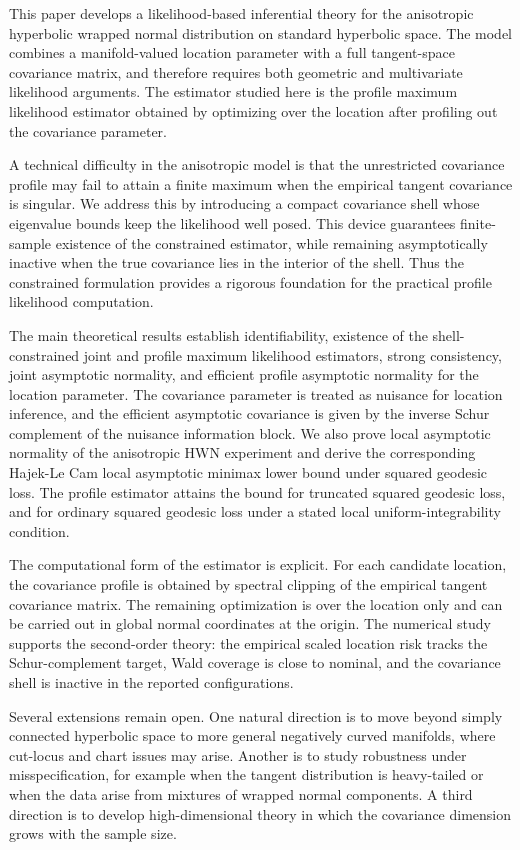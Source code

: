 \documentclass[11pt]{article}
\begin{document}
This paper develops a likelihood-based inferential theory for the anisotropic hyperbolic wrapped normal distribution on standard hyperbolic space. The model combines a manifold-valued location parameter with a full tangent-space covariance matrix, and therefore requires both geometric and multivariate likelihood arguments. The estimator studied here is the profile maximum likelihood estimator obtained by optimizing over the location after profiling out the covariance parameter.

A technical difficulty in the anisotropic model is that the unrestricted covariance profile may fail to attain a finite maximum when the empirical tangent covariance is singular. We address this by introducing a compact covariance shell whose eigenvalue bounds keep the likelihood well posed. This device guarantees finite-sample existence of the constrained estimator, while remaining asymptotically inactive when the true covariance lies in the interior of the shell. Thus the constrained formulation provides a rigorous foundation for the practical profile likelihood computation.

The main theoretical results establish identifiability, existence of the shell-constrained joint and profile maximum likelihood estimators, strong consistency, joint asymptotic normality, and efficient profile asymptotic normality for the location parameter. The covariance parameter is treated as nuisance for location inference, and the efficient asymptotic covariance is given by the inverse Schur complement of the nuisance information block. We also prove local asymptotic normality of the anisotropic HWN experiment and derive the corresponding Hajek-Le Cam local asymptotic minimax lower bound under squared geodesic loss. The profile estimator attains the bound for truncated squared geodesic loss, and for ordinary squared geodesic loss under a stated local uniform-integrability condition.

The computational form of the estimator is explicit. For each candidate location, the covariance profile is obtained by spectral clipping of the empirical tangent covariance matrix. The remaining optimization is over the location only and can be carried out in global normal coordinates at the origin. The numerical study supports the second-order theory: the empirical scaled location risk tracks the Schur-complement target, Wald coverage is close to nominal, and the covariance shell is inactive in the reported configurations.

Several extensions remain open. One natural direction is to move beyond simply connected hyperbolic space to more general negatively curved manifolds, where cut-locus and chart issues may arise. Another is to study robustness under misspecification, for example when the tangent distribution is heavy-tailed or when the data arise from mixtures of wrapped normal components. A third direction is to develop high-dimensional theory in which the covariance dimension grows with the sample size.
\end{document}
